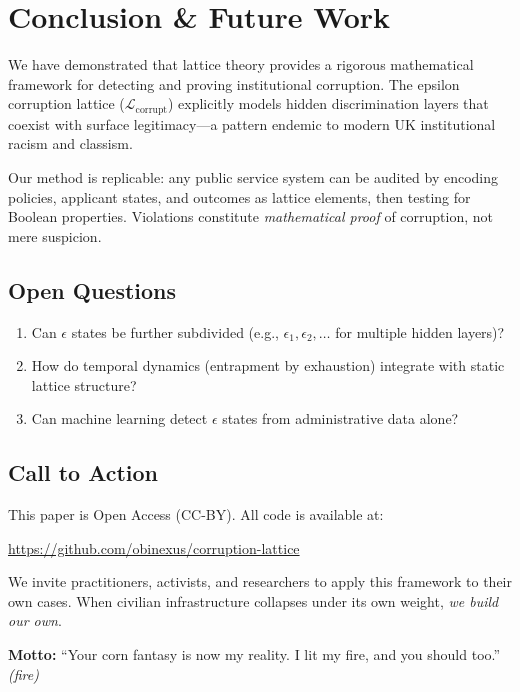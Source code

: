 \documentclass[11pt,a4paper]{article}
\theoremstyle{definition}
\begin{document}
\section{Conclusion \& Future Work}

We have demonstrated that lattice theory provides a rigorous mathematical framework for detecting and proving institutional corruption. The epsilon corruption lattice ($\mathcal{L}_{\text{corrupt}}$) explicitly models hidden discrimination layers that coexist with surface legitimacy—a pattern endemic to modern UK institutional racism and classism.

Our method is replicable: any public service system can be audited by encoding policies, applicant states, and outcomes as lattice elements, then testing for Boolean properties. Violations constitute \emph{mathematical proof} of corruption, not mere suspicion.

\subsection{Open Questions}

\begin{enumerate}
    \item Can $\epsilon$ states be further subdivided (e.g., $\epsilon_1, \epsilon_2, \ldots$ for multiple hidden layers)?
    \item How do temporal dynamics (entrapment by exhaustion) integrate with static lattice structure?
    \item Can machine learning detect $\epsilon$ states from administrative data alone?
\end{enumerate}

\subsection{Call to Action}

This paper is Open Access (CC-BY). All code is available at:
\begin{center}
\url{https://github.com/obinexus/corruption-lattice}
\end{center}

We invite practitioners, activists, and researchers to apply this framework to their own cases. When civilian infrastructure collapses under its own weight, \emph{we build our own}.

\vspace{1em}
\noindent \textbf{Motto:} ``Your corn fantasy is now my reality. I lit my fire, and you should too.'' \textit{(fire)}
\end{document}
